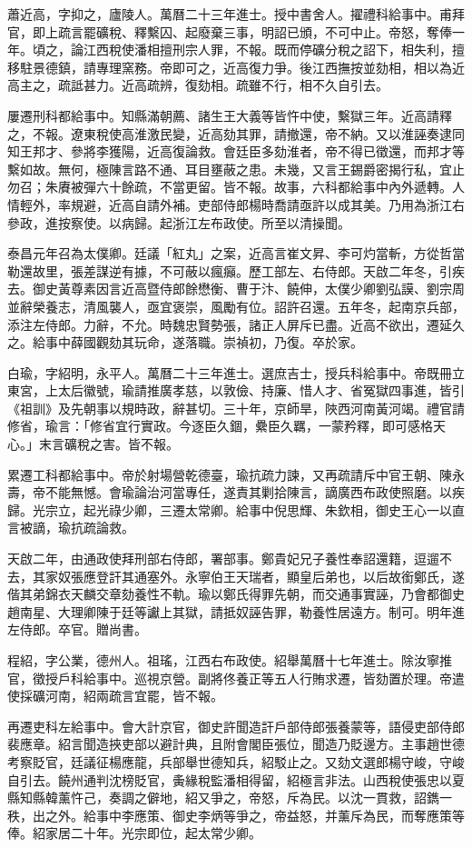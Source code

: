 \begin{pinyinscope}
蕭近高，字抑之，廬陵人。萬曆二十三年進士。授中書舍人。擢禮科給事中。甫拜官，即上疏言罷礦稅、釋繫囚、起廢棄三事，明詔已頒，不可中止。帝怒，奪俸一年。頃之，論江西稅使潘相擅刑宗人罪，不報。既而停礦分稅之詔下，相失利，擅移駐景德鎮，請專理窯務。帝即可之，近高復力爭。後江西撫按並劾相，相以為近高主之，疏詆甚力。近高疏辨，復劾相。疏雖不行，相不久自引去。

屢遷刑科都給事中。知縣滿朝薦、諸生王大義等皆忤中使，繫獄三年。近高請釋之，不報。遼東稅使高淮激民變，近高劾其罪，請撤還，帝不納。又以淮誣奏逮同知王邦才、參將李獲陽，近高復論救。會廷臣多劾淮者，帝不得已徵還，而邦才等繫如故。無何，極陳言路不通、耳目壅蔽之患。未幾，又言王錫爵密揭行私，宜止勿召；朱賡被彈六十餘疏，不當更留。皆不報。故事，六科都給事中內外遞轉。人情輕外，率規避，近高自請外補。吏部侍郎楊時喬請亟許以成其美。乃用為浙江右參政，進按察使。以病歸。起浙江左布政使。所至以清操聞。

泰昌元年召為太僕卿。廷議「紅丸」之案，近高言崔文昇、李可灼當斬，方從哲當勒還故里，張差謀逆有據，不可蔽以瘋癲。歷工部左、右侍郎。天啟二年冬，引疾去。御史黃尊素因言近高暨侍郎餘懋衡、曹于汴、饒伸，太僕少卿劉弘謨、劉宗周並辭榮養志，清風襲人，亟宜褒崇，風勵有位。詔許召還。五年冬，起南京兵部，添注左侍郎。力辭，不允。時魏忠賢勢張，諸正人屏斥已盡。近高不欲出，遷延久之。給事中薛國觀劾其玩命，遂落職。崇禎初，乃復。卒於家。

白瑜，字紹明，永平人。萬曆二十三年進士。選庶吉士，授兵科給事中。帝既冊立東宮，上太后徽號，瑜請推廣孝慈，以敦儉、持廉、惜人才、省冤獄四事進，皆引《祖訓》及先朝事以規時政，辭甚切。三十年，京師旱，陜西河南黃河竭。禮官請修省，瑜言：「修省宜行實政。今逐臣久錮，纍臣久羈，一蒙矜釋，即可感格天心。」末言礦稅之害。皆不報。

累遷工科都給事中。帝於射場營乾德臺，瑜抗疏力諫，又再疏請斥中官王朝、陳永壽，帝不能無憾。會瑜論治河當專任，遂責其剿拾陳言，謫廣西布政使照磨。以疾歸。光宗立，起光祿少卿，三遷太常卿。給事中倪思輝、朱欽相，御史王心一以直言被謫，瑜抗疏論救。

天啟二年，由通政使拜刑部右侍郎，署部事。鄭貴妃兄子養性奉詔還籍，逗遛不去，其家奴張應登訐其通塞外。永寧伯王天瑞者，顯皇后弟也，以后故銜鄭氏，遂偕其弟錦衣天麟交章劾養性不軌。瑜以鄭氏得罪先朝，而交通事實誣，乃會都御史趙南星、大理卿陳于廷等讞上其獄，請抵奴誣告罪，勒養性居遠方。制可。明年進左侍郎。卒官。贈尚書。

程紹，字公業，德州人。祖瑤，江西右布政使。紹舉萬曆十七年進士。除汝寧推官，徵授戶科給事中。巡視京營。副將佟養正等五人行賄求遷，皆劾置於理。帝遣使採礦河南，紹兩疏言宜罷，皆不報。

再遷吏科左給事中。會大計京官，御史許聞造訐戶部侍郎張養蒙等，語侵吏部侍郎裴應章。紹言聞造挾吏部以避計典，且附會閣臣張位，聞造乃貶邊方。主事趙世德考察貶官，廷議征楊應龍，兵部舉世德知兵，紹駁止之。又劾文選郎楊守峻，守峻自引去。饒州通判沈榜貶官，夤緣稅監潘相得留，紹極言非法。山西稅使張忠以夏縣知縣韓薰忤己，奏調之僻地，紹又爭之，帝怒，斥為民。以沈一貫救，詔鐫一秩，出之外。給事中李應策、御史李炳等爭之，帝益怒，并薰斥為民，而奪應策等俸。紹家居二十年。光宗即位，起太常少卿。


\end{pinyinscope}
